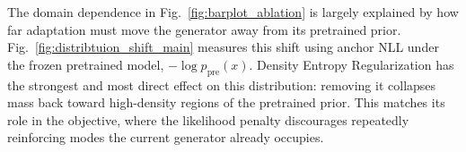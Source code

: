 \documentclass{article}
\begin{document}
The domain dependence in Fig.~\ref{fig:barplot_ablation} is largely explained by how far adaptation must move the generator away from its pretrained prior. Fig.~\ref{fig:distribtuion_shift_main} measures this shift using anchor NLL under the frozen pretrained model, $-\log p_{\text{pre}}(x)$. Density Entropy Regularization has the strongest and most direct effect on this distribution: removing it collapses mass back toward high-density regions of the pretrained prior. This matches its role in the objective, where the likelihood penalty discourages repeatedly reinforcing modes the current generator already occupies.
\end{document}
